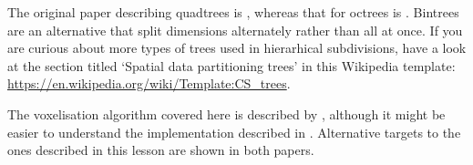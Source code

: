 The original paper describing quadtrees is \citet{Finkel74}, whereas that for octrees is \citet{Meagher80}.
Bintrees~\citep{Samet85} are an alternative that split dimensions alternately rather than all at once.
If you are curious about more types of trees used in hierarhical subdivisions, have a look at the section titled `Spatial data partitioning trees' in this Wikipedia template: \url{https://en.wikipedia.org/wiki/Template:CS_trees}.

The voxelisation algorithm covered here is described by \citet{Laine13}, although it might be easier to understand the implementation described in \citet{Nourian16}.
Alternative targets to the ones described in this lesson are shown in both papers.
